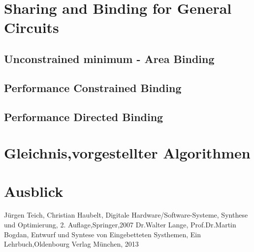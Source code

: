 \documentclass[conference]{IEEEtran}
\begin{document}
\section{Sharing and Binding for General Circuits}
\subsection{Unconstrained minimum - Area Binding}
\subsection{Performance Constrained Binding}
\subsection{Performance Directed Binding}
\section{Gleichnis,vorgestellter Algorithmen}
\section{Ausblick}

\begin{thebibliography}{00}
 Jürgen Teich, Christian Haubelt, Digitale Hardware/Software-Systeme, Synthese und Optimierung, 2. Auflage,Springer,2007
 Dr.Walter Lange, Prof.Dr.Martin Bogdan, Entwurf und Syntese von Eingebetteten Systhemen, Ein Lehrbuch,Oldenbourg Verlag München, 2013
\end{thebibliography}
\vspace{12pt}
\end{document}
